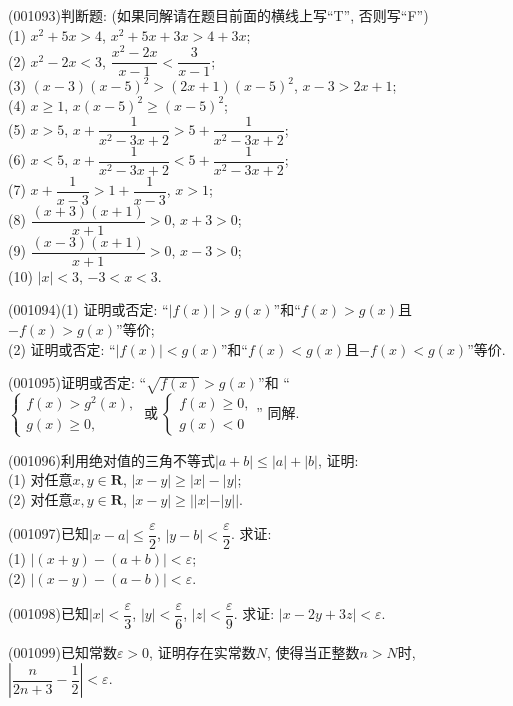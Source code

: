 \item (001093)判断题: (如果同解请在题目前面的横线上写``T'', 否则写``F'')\\ 
(1) $x^2+5x>4$, $x^2+5x+3x>4+3x$;\\ 
(2) $x^2-2x<3$, $\dfrac{x^2-2x}{x-1}<\dfrac{3}{x-1}$;\\ 
(3) $(x-3)(x-5)^2>(2x+1)(x-5)^2$, $x-3>2x+1$;\\ 
(4) $x\ge 1$, $x(x-5)^2\ge (x-5)^2$;\\ 
(5) $x>5$, $x+\dfrac{1}{x^2-3x+2}> 5+\dfrac{1}{x^2-3x+2}$;\\ 
(6) $x<5$, $x+\dfrac{1}{x^2-3x+2}< 5+\dfrac{1}{x^2-3x+2}$;\\ 
(7) $x+\dfrac{1}{x-3}>1+\dfrac{1}{x-3}$, $x>1$;\\ 
(8) $\dfrac{(x+3)(x+1)}{x+1}>0$, $x+3>0$;\\ 
(9) $\dfrac{(x-3)(x+1)}{x+1}>0$, $x-3>0$;\\ 
(10) $|x|<3$, $-3<x<3$.
\item (001094)(1) 证明或否定: ``$|f(x)|>g(x)$''和``$f(x)>g(x)$且$-f(x)>g(x)$''等价;\\ 
(2) 证明或否定: ``$|f(x)|<g(x)$''和``$f(x)<g(x)$且$-f(x)<g(x)$''等价.
\item (001095)证明或否定: ``$\sqrt{f(x)}>g(x)$''和
``$\left\{\begin{array}{l}f(x)>g^2(x),\\g(x)\ge 0,\end{array}\right.\ \text{或} \ \left\{\begin{array}{l}f(x)\ge 0,\\g(x)<0\end{array}\right.$''
同解.
\item (001096)利用绝对值的三角不等式$|a+b|\le |a|+|b|$, 证明:\\ 
(1) 对任意$x,y\in\mathbf{R}$, $|x-y|\ge |x|-|y|$;\\ 
(2) 对任意$x,y\in\mathbf{R}$, $|x-y|\ge ||x|-|y||$.
\item (001097)已知$|x-a|\le \dfrac{\varepsilon}{2}$, $|y-b|<\dfrac{\varepsilon}{2}$. 求证:\\ 
(1) $|(x+y)-(a+b)|<\varepsilon$;\\ 
(2) $|(x-y)-(a-b)|<\varepsilon$.
\item (001098)已知$|x|<\dfrac{\varepsilon}{3}$, $|y|<\dfrac{\varepsilon}{6}$, $|z|<\dfrac{\varepsilon}{9}$. 求证: $|x-2y+3z|<\varepsilon$.
\item (001099)已知常数$\varepsilon>0$, 证明存在实常数$N$, 使得当正整数$n>N$时, $\left|\dfrac{n}{2n+3}-\dfrac{1}{2}\right|<\varepsilon$.
